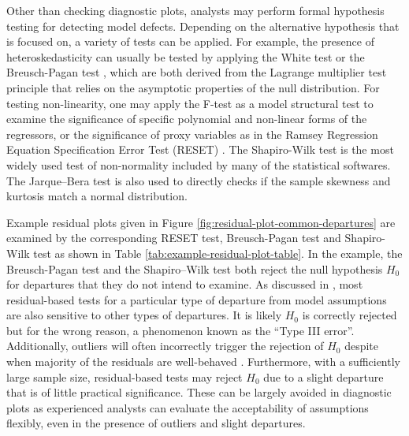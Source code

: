 \documentclass[]{interact}
\theoremstyle{plain}%
\theoremstyle{definition}
\theoremstyle{remark}
\begin{document}
Other than checking diagnostic plots, analysts may perform formal
hypothesis testing for detecting model defects. Depending on the
alternative hypothesis that is focused on, a variety of tests can be
applied. For example, the presence of heteroskedasticity can usually be
tested by applying the White test
\citep{white_heteroskedasticity-consistent_1980} or the Breusch-Pagan
test \citep{breusch_simple_1979}, which are both derived from the
Lagrange multiplier test \citep{silvey1959lagrangian} principle that
relies on the asymptotic properties of the null distribution. For
testing non-linearity, one may apply the F-test as a model structural
test to examine the significance of specific polynomial and non-linear
forms of the regressors, or the significance of proxy variables as in
the Ramsey Regression Equation Specification Error Test (RESET)
\citep{ramsey_tests_1969}. The Shapiro-Wilk test
\citep{shapiro1965analysis} is the most widely used test of
non-normality included by many of the statistical softwares. The
Jarque--Bera test \citep{jarque1980efficient} is also used to directly
checks if the sample skewness and kurtosis match a normal distribution.

Example residual plots given in Figure
\ref{fig:residual-plot-common-departures} are examined by the
corresponding RESET test, Breusch-Pagan test and Shapiro-Wilk test as
shown in Table \ref{tab:example-residual-plot-table}. In the example,
the Breusch-Pagan test and the Shapiro--Wilk test both reject the null
hypothesis \(H_0\) for departures that they do not intend to examine. As
discussed in \citet{cook1982residuals}, most residual-based tests for a
particular type of departure from model assumptions are also sensitive
to other types of departures. It is likely \(H_0\) is correctly rejected
but for the wrong reason, a phenomenon known as the ``Type III error''.
Additionally, outliers will often incorrectly trigger the rejection of
\(H_0\) despite when majority of the residuals are well-behaved
\citep{cook_applied_1999}. Furthermore, with a sufficiently large sample
size, residual-based tests may reject \(H_0\) due to a slight departure
that is of little practical significance. These can be largely avoided
in diagnostic plots as experienced analysts can evaluate the
acceptability of assumptions flexibly, even in the presence of outliers
and slight departures.
\end{document}
